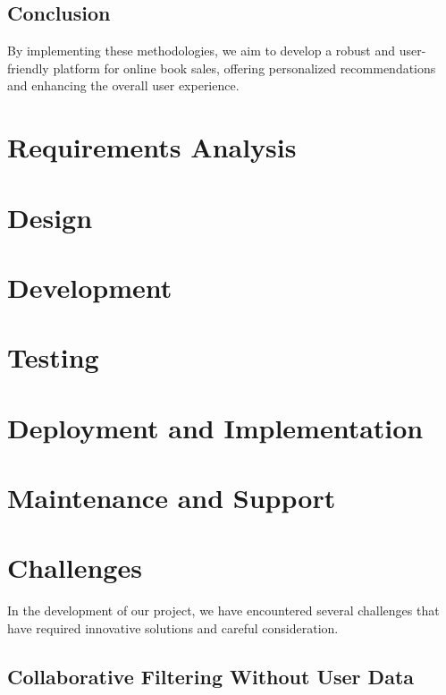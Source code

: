 \documentclass{article}
\begin{document}
\subsection{Conclusion}

By implementing these methodologies, we aim to develop a robust and user-friendly platform for online book sales, offering personalized recommendations and enhancing the overall user experience.


\section{Requirements Analysis}

\section{Design}

\section{Development}

\section{Testing}

\section{Deployment and Implementation}

\section{Maintenance and Support}

\section{Challenges}

In the development of our project, we have encountered several challenges that have required innovative solutions and careful consideration.

\subsection{Collaborative Filtering Without User Data}
\end{document}
